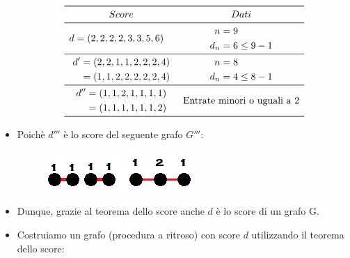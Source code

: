 \documentclass[10pt]{article}
\begin{document}
\begin{itemize}
	\[
	\begin{array}{cc}
		\toprule
		Score & Dati \\
		\midrule
		\begin{split} d &= (2,2,2,2,3,3,5,6) \end{split} & \begin{split} n &= 9 \\ d_n &= 6 \leq 9 -1 \end{split} \\
		\midrule
		\begin{split} d' &= (2,2,1,1,2,2,2,4) \\ &= (1,1,2,2,2,2,2,4) \end{split} & \begin{split} n &= 8 \\ d_n &= 4 \leq 8 -1 \end{split} \\
		\midrule
		\begin{split} d'' &= (1,1,2,1,1,1,1) \\ &= (1,1,1,1,1,1,2) \end{split} & \textrm{Entrate minori o uguali a 2} \\
		\bottomrule
	\end{array}
	\]
	\item
	Poichè $d'''$ è lo score del seguente grafo $G'''$:
	\begin{center}
		\begin{figure}[h]
		\centering
		\includegraphics[width = 0.2\linewidth]{scoreGrafo_Esercizio3}
	\end{figure}
	\end{center}
	\item 
	Dunque, grazie al teorema dello score anche $d$ è lo score di un grafo G.
	\item
	Costruiamo un grafo (procedura a ritroso) con score $d$ utilizzando il teorema dello score:
	\end{itemize}
	
\end{document}
